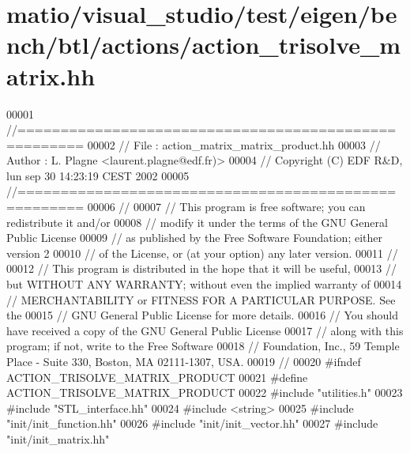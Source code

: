 \hypertarget{matio_2visual__studio_2test_2eigen_2bench_2btl_2actions_2action__trisolve__matrix_8hh_source}{}\section{matio/visual\+\_\+studio/test/eigen/bench/btl/actions/action\+\_\+trisolve\+\_\+matrix.hh}
\label{matio_2visual__studio_2test_2eigen_2bench_2btl_2actions_2action__trisolve__matrix_8hh_source}

\begin{DoxyCode}
00001 \textcolor{comment}{//=====================================================}
00002 \textcolor{comment}{// File   :  action\_matrix\_matrix\_product.hh}
00003 \textcolor{comment}{// Author :  L. Plagne <laurent.plagne@edf.fr)>}
00004 \textcolor{comment}{// Copyright (C) EDF R&D,  lun sep 30 14:23:19 CEST 2002}
00005 \textcolor{comment}{//=====================================================}
00006 \textcolor{comment}{//}
00007 \textcolor{comment}{// This program is free software; you can redistribute it and/or}
00008 \textcolor{comment}{// modify it under the terms of the GNU General Public License}
00009 \textcolor{comment}{// as published by the Free Software Foundation; either version 2}
00010 \textcolor{comment}{// of the License, or (at your option) any later version.}
00011 \textcolor{comment}{//}
00012 \textcolor{comment}{// This program is distributed in the hope that it will be useful,}
00013 \textcolor{comment}{// but WITHOUT ANY WARRANTY; without even the implied warranty of}
00014 \textcolor{comment}{// MERCHANTABILITY or FITNESS FOR A PARTICULAR PURPOSE.  See the}
00015 \textcolor{comment}{// GNU General Public License for more details.}
00016 \textcolor{comment}{// You should have received a copy of the GNU General Public License}
00017 \textcolor{comment}{// along with this program; if not, write to the Free Software}
00018 \textcolor{comment}{// Foundation, Inc., 59 Temple Place - Suite 330, Boston, MA  02111-1307, USA.}
00019 \textcolor{comment}{//}
00020 \textcolor{preprocessor}{#ifndef ACTION\_TRISOLVE\_MATRIX\_PRODUCT}
00021 \textcolor{preprocessor}{#define ACTION\_TRISOLVE\_MATRIX\_PRODUCT}
00022 \textcolor{preprocessor}{#include "utilities.h"}
00023 \textcolor{preprocessor}{#include "STL\_interface.hh"}
00024 \textcolor{preprocessor}{#include <string>}
00025 \textcolor{preprocessor}{#include "init/init\_function.hh"}
00026 \textcolor{preprocessor}{#include "init/init\_vector.hh"}
00027 \textcolor{preprocessor}{#include "init/init\_matrix.hh"}

\end{DoxyCode}
